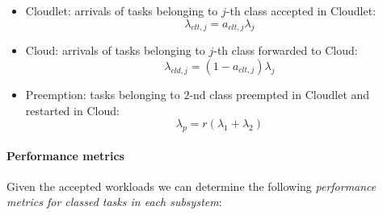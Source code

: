 \begin{itemize}
	\item Cloudlet: arrivals of tasks belonging to $j$-th class accepted in Cloudlet:
	\begin{equation}
	\lambda_{clt,j} = a_{clt,j}\lambda_{j}
	\end{equation}
	
	\item Cloud: arrivals of tasks belonging to $j$-th class forwarded to Cloud:
	\begin{equation}
	\lambda_{cld,j} = (1-a_{clt,j})\lambda_{j}
	\end{equation}
	
	\item Preemption: tasks belonging to $2$-nd class preempted in Cloudlet and restarted in Cloud:
	\begin{equation}
	\lambda_{p} = r(\lambda_{1}+\lambda_{2})
	\end{equation}
\end{itemize}

\paragraph{Performance metrics}
Given the accepted workloads we can determine the following \textit{performance metrics for classed tasks in each subsystem}:

